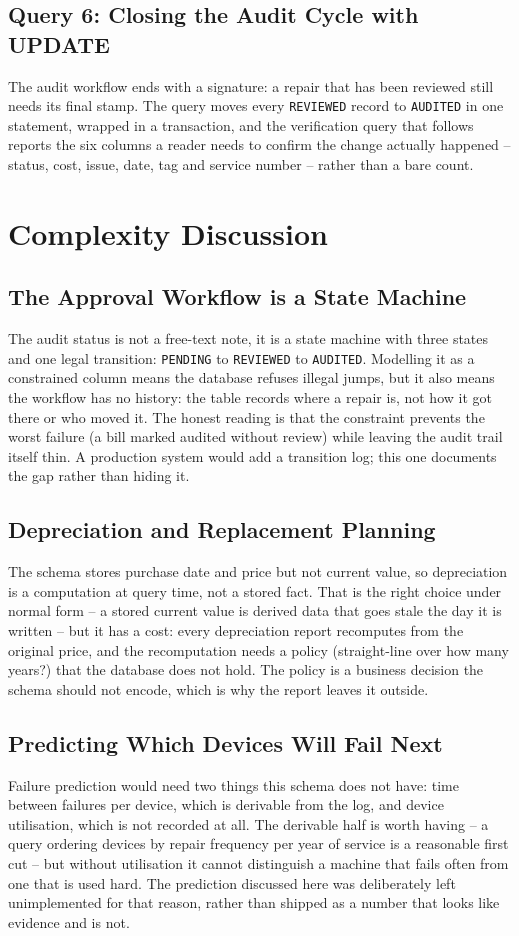\documentclass[conference,9pt]{IEEEtran}
\begin{document}
\subsection{Query 6: Closing the Audit Cycle with UPDATE}
The audit workflow ends with a signature: a repair that has been reviewed
still needs its final stamp. The query moves every \texttt{REVIEWED} record to
\texttt{AUDITED} in one statement, wrapped in a transaction, and the
verification query that follows reports the six columns a reader needs to
confirm the change actually happened -- status, cost, issue, date, tag and
service number -- rather than a bare count.

\section{Complexity Discussion}
\subsection{The Approval Workflow is a State Machine}
The audit status is not a free-text note, it is a state machine with three
states and one legal transition: \texttt{PENDING} to \texttt{REVIEWED} to
\texttt{AUDITED}. Modelling it as a constrained column means the database
refuses illegal jumps, but it also means the workflow has no history: the
table records where a repair is, not how it got there or who moved it. The
honest reading is that the constraint prevents the worst failure (a bill
marked audited without review) while leaving the audit trail itself thin. A
production system would add a transition log; this one documents the gap
rather than hiding it.

\subsection{Depreciation and Replacement Planning}
The schema stores purchase date and price but not current value, so
depreciation is a computation at query time, not a stored fact. That is the
right choice under normal form -- a stored current value is derived data that
goes stale the day it is written -- but it has a cost: every depreciation
report recomputes from the original price, and the recomputation needs a
policy (straight-line over how many years?) that the database does not hold.
The policy is a business decision the schema should not encode, which is why
the report leaves it outside.

\subsection{Predicting Which Devices Will Fail Next}
Failure prediction would need two things this schema does not have: time
between failures per device, which is derivable from the log, and device
utilisation, which is not recorded at all. The derivable half is worth having
-- a query ordering devices by repair frequency per year of service is a
reasonable first cut -- but without utilisation it cannot distinguish a
machine that fails often from one that is used hard. The prediction discussed
here was deliberately left unimplemented for that reason, rather than shipped
as a number that looks like evidence and is not.
\end{document}
